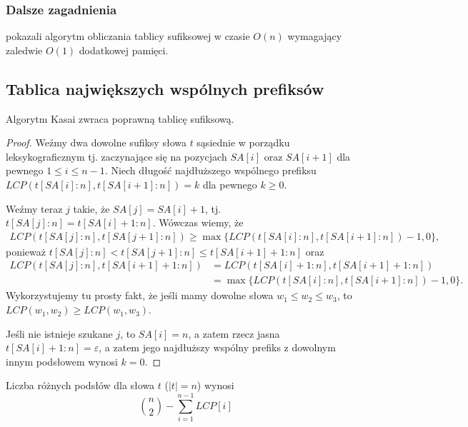 
\subsubsection{Dalsze zagadnienia}

\citet{li2018optimal} pokazali algorytm obliczania tablicy sufiksowej w czasie $O(n)$ wymagający zaledwie $O(1)$ dodatkowej pamięci.

\subsection{Tablica największych wspólnych prefiksów}


\begin{theorem}{}{}
  Algorytm Kasai zwraca poprawną tablicę sufiksową.
\end{theorem}

\begin{proof}
  Weźmy dwa dowolne sufiksy słowa $t$ sąsiednie w porządku leksykograficznym tj. zaczynające się na pozycjach $SA[i]$ oraz $SA[i + 1]$ dla pewnego $1 \le i \le n - 1$. Niech długość najdłuższego wspólnego prefiksu $LCP(t[SA[i]:n], t[SA[i + 1]:n]) = k$ dla pewnego $k \ge 0$.

  Weźmy teraz $j$ takie, że $SA[j] = SA[i] + 1$, tj. $t[SA[j]:n] = t[SA[i] + 1:n]$. Wówczas wiemy, że
  \begin{align*}
    LCP(t[SA[j]:n], t[SA[j + 1]:n]) \ge \max\{LCP(t[SA[i]:n], t[SA[i + 1]:n]) - 1, 0\},
  \end{align*}
  ponieważ $t[SA[j]:n] < t[SA[j + 1]:n] \le t[SA[i + 1] + 1:n]$
  oraz
  \begin{align*}
    LCP(t[SA[j]:n], t[SA[i + 1] + 1:n])
        & = LCP(t[SA[i] + 1:n], t[SA[i + 1] + 1:n]) \\
        & = \max\{LCP(t[SA[i]:n], t[SA[i + 1]:n]) - 1, 0\}.
  \end{align*}
  Wykorzystujemy tu prosty fakt, że jeśli mamy dowolne słowa $w_1 \le w_2 \le w_3$, to $LCP(w_1, w_2) \ge LCP(w_1, w_3)$.

  Jeśli nie istnieje szukane $j$, to $SA[i] = n$, a zatem rzecz jasna $t[SA[i] + 1:n] = \varepsilon$, a zatem jego najdłuższy wspólny prefiks z dowolnym innym podsłowem wynosi $k = 0$.
\end{proof}

\begin{theorem}{}{}
  Liczba różnych podsłów dla słowa $t$ ($|t| = n$) wynosi
  \begin{equation*}
    \binom{n}{2} - \sum_{i = 1}^{n - 1} LCP[i]
  \end{equation*}
\end{theorem}

